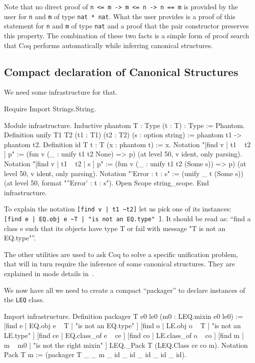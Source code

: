 Note that no direct proof of \texttt{n <= m -> m <= n -> n == m} is provided by the
user for \texttt{n} and \texttt{m} of type \texttt{nat * nat}.  What the user provides is a proof of
this statement for \texttt{n} and \texttt{m} of type \texttt{nat} and a proof that the pair
constructor preserves this property.  The combination of these two facts is a
simple form of proof search that Coq performs automatically while inferring
canonical structures.

\subsection{Compact declaration of Canonical Structures}

We need some infrastructure for that.

\begin{coq_example*}
Require Import Strings.String.
\end{coq_example*}
\begin{coq_example}
Module infrastructure.
  Inductive phantom {T : Type} (t : T) : Type := Phantom.
  Definition unify {T1 T2} (t1 : T1) (t2 : T2) (s : option string) :=
    phantom t1 -> phantom t2.
  Definition id {T} {t : T} (x : phantom t) := x.
  Notation "[find v | t1 ~ t2 ] p" := (fun v (_ : unify t1 t2 None) => p)
    (at level 50, v ident, only parsing).
  Notation "[find v | t1 ~ t2 | s ] p" := (fun v (_ : unify t1 t2 (Some s)) => p)
    (at level 50, v ident, only parsing).
  Notation "'Error : t : s" := (unify _ t (Some s))
    (at level 50, format "''Error'  :  t  :  s").
  Open Scope string_scope.
End infrastructure.
\end{coq_example}

To explain the notation \texttt{[find v | t1 \textasciitilde t2]} let us pick one
of its instances: \texttt{[find e | EQ.obj e \textasciitilde T | "is not an EQ.type" ]}.
It should be read as: ``find a class e such that its objects have type T
or fail with message "T is not an EQ.type"''.

The other utilities are used to ask Coq to solve a specific unification
problem, that will in turn require the inference of some canonical
structures.  They are explained in mode details in~\cite{CSwcu}.

We now have all we need to create a compact ``packager'' to declare
instances of the \texttt{LEQ} class.

\begin{coq_example}
Import infrastructure.
Definition packager T e0 le0 (m0 : LEQ.mixin e0 le0) :=
    [find e  | EQ.obj e ~ T       | "is not an EQ.type" ]
    [find o  | LE.obj o ~ T       | "is not an LE.type" ]
    [find ce | EQ.class_of e ~ ce ]
    [find co | LE.class_of o ~ co ]
    [find m  | m ~ m0             | "is not the right mixin" ]
  LEQ._Pack T (LEQ.Class ce co m).
Notation Pack T m := (packager T _ _ m _ id _ id _ id _ id _ id).
\end{coq_example}

